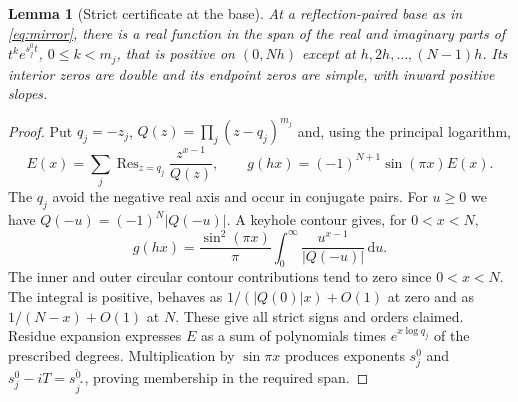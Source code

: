 \documentclass[11pt]{article}
\newtheorem{lemma}[theorem]{Lemma}
\theoremstyle{remark}\newtheorem{remark}[theorem]{Remark}
\newcommand{\dd}{\,\mathrm d}
\DeclareMathOperator{\Res}{Res}
\begin{document}
\begin{lemma}[Strict certificate at the base]\label{lem:certificate}
At a reflection-paired base as in \eqref{eq:mirror}, there is a real function in the span of the real and imaginary parts of $t^ke^{s_j^0t}$, $0\le k<m_j$, that is positive on $(0,Nh)$ except at $h,2h,\ldots,(N-1)h$. Its interior zeros are double and its endpoint zeros are simple, with inward positive slopes.
\end{lemma}
\begin{proof}
Put $q_j=-z_j$, $Q(z)=\prod_j(z-q_j)^{m_j}$ and, using the principal logarithm,
\[
 E(x)=\sum_j\Res_{z=q_j}\frac{z^{x-1}}{Q(z)},\qquad
 g(hx)=(-1)^{N+1}\sin(\pi x)E(x).
\]
The $q_j$ avoid the negative real axis and occur in conjugate pairs. For $u\ge0$ we have $Q(-u)=(-1)^N|Q(-u)|$. A keyhole contour gives, for $0<x<N$,
\begin{equation}\label{eq:certificate}
 g(hx)=\frac{\sin^2(\pi x)}{\pi}
 \int_0^\infty\frac{u^{x-1}}{|Q(-u)|}\dd u.
\end{equation}
The inner and outer circular contour contributions tend to zero since $0<x<N$. The integral is positive, behaves as $1/(|Q(0)|x)+O(1)$ at zero and as $1/(N-x)+O(1)$ at $N$. These give all strict signs and orders claimed. Residue expansion expresses $E$ as a sum of polynomials times $e^{x\log q_j}$ of the prescribed degrees. Multiplication by $\sin\pi x$ produces exponents $s_j^0$ and $s_j^0-iT=\overline{s_{j^*}^0}$, proving membership in the required span.
\end{proof}
\end{document}
